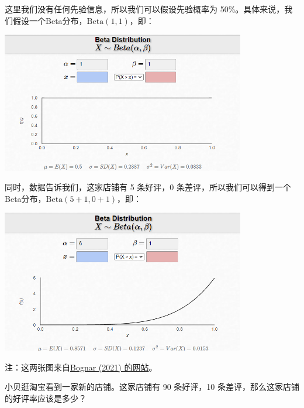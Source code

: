 \documentclass[UTF8]{ctexart}
\begin{document}
\begin{Answer}
	这里我们没有任何先验信息，所以我们可以假设先验概率为 50\%。具体来说，我们假设一个Beta分布，$\text{Beta}(1, 1)$，即：

	\begin{center}
		\includegraphics[width=0.8\textwidth]{fig11.png}
	\end{center}

	同时，数据告诉我们，这家店铺有 5 条好评，0 条差评，所以我们可以得到一个Beta分布，$\text{Beta}(5+1, 0+1)$，即：

	\begin{center}
		\includegraphics[width=0.8\textwidth]{fig12.png}
	\end{center}

	注：这两张图来自\href{https://homepage.divms.uiowa.edu/~mbognar/applets/beta.html}{Bognar (2021) 的网站}。

\end{Answer}

\begin{Exercise}
	小贝逛淘宝看到一家新的店铺。这家店铺有 90 条好评，10 条差评，那么这家店铺的好评率应该是多少？
\end{Exercise}
\end{document}
